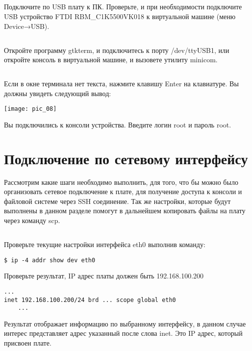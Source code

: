 \subsection{}Подключите по USB плату к ПК. Проверьте, и при необходимости подключите USB устройство FTDI RBM\_C1K5500VK018 к виртуальной машине (меню Device→USB).

\subsection{}Откройте программу gtkterm, и подключитесь к порту /dev/ttyUSB1, или откройте консоль в виртуальной машине, и вызовете утилиту minicom.

\subsection{}Если в окне терминала нет текста, нажмите клавишу Enter на клавиатуре. Вы должны увидеть следующий вывод:
\begin{center}
	\texttt{[image: pic\_08]}
\end{center}
Вы подключились к консоли устройства. Введите логин root и пароль root.

\section{Подключение по сетевому интерфейсу}

Рассмотрим какие шаги необходимо выполнить, для того, что бы можно было организовать сетевое подключение к плате, для получение доступа к консоли и файловой системе через SSH соединение. Так же настройки, которые будут выполнены в данном разделе помогут в дальнейшем копировать файлы на плату через команду scp.

\subsection{}Проверьте текущие настройки интерфейса eth0 выполнив команду: 
\begin{lstlisting}[style=bash]
$ ip -4 addr show dev eth0 
\end{lstlisting}
Проверьте результат, IP адрес платы должен быть 192.168.100.200
\begin{lstlisting}[style=stdout]
	...
inet 192.168.100.200/24 brd ... scope global eth0 
	...
\end{lstlisting}
Результат отображает информацию по выбранному интерфейсу, в данном случае интерес представляет адрес указанный после слова inet. Это IP адрес, который присвоен плате.
 
